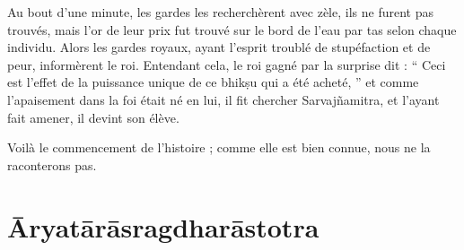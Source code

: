 \documentclass[a4paper, 11pt, oneside, french]{article}
\begin{document}
Au bout d'une minute, les gardes les recherchèrent avec zèle, ils ne furent pas trouvés, mais l'or de leur prix fut trouvé sur le bord de l'eau par tas selon chaque individu. Alors les gardes royaux, ayant l'esprit troublé de stupéfaction et de peur, informèrent le roi. Entendant cela, le roi gagné par la surprise dit : `` Ceci est l'effet de la puissance unique de ce bhik\d{s}u qui a été acheté, '' et comme l'apaisement dans la foi était né en lui, il fit chercher Sarvaj\~{n}amitra, et l'ayant fait amener, il devint son élève.

Voilà le commencement de l'histoire ; comme elle est bien connue, nous ne la raconterons pas.
\clearpage
\section{\={A}ryat\={a}r\={a}sragdhar\={a}stotra}
\end{document}
